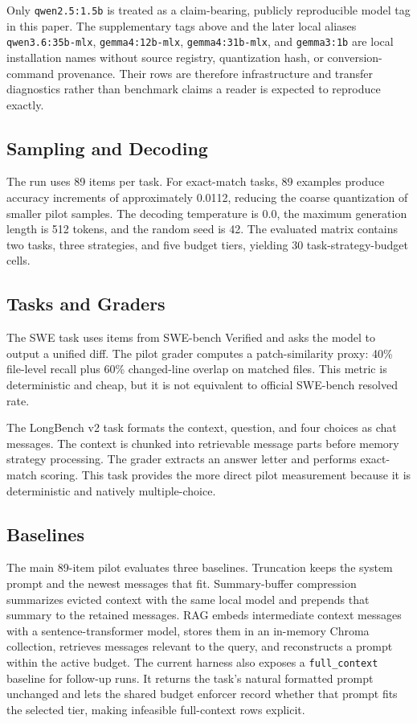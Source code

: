\documentclass[11pt]{article}
\newcommand{\RunModel}{\texttt{qwen2.5:1.5b}}
\begin{document}
Only \RunModel{} is treated as a claim-bearing, publicly reproducible model
tag in this paper.  The supplementary tags above and the later local aliases
\texttt{qwen3.6:35b-mlx}, \texttt{gemma4:12b-mlx},
\texttt{gemma4:31b-mlx}, and \texttt{gemma3:1b} are local installation names
without source registry, quantization hash, or conversion-command provenance.
Their rows are therefore infrastructure and transfer diagnostics rather than
benchmark claims a reader is expected to reproduce exactly.

\subsection{Sampling and Decoding}

The run uses 89 items per task.  For exact-match tasks, 89 examples produce
accuracy increments of approximately 0.0112, reducing the coarse quantization
of smaller pilot samples.  The decoding temperature is 0.0, the maximum
generation length is 512 tokens, and the random seed is 42.  The evaluated
matrix contains two tasks, three strategies, and five budget tiers, yielding
30 task-strategy-budget cells.

\subsection{Tasks and Graders}

The SWE task uses items from SWE-bench Verified and asks the model to output a
unified diff.  The pilot grader computes a patch-similarity proxy:
40\% file-level recall plus 60\% changed-line overlap on matched files.  This
metric is deterministic and cheap, but it is not equivalent to official
SWE-bench resolved rate.

The LongBench v2 task formats the context, question, and four choices as chat
messages.  The context is chunked into retrievable message parts before memory
strategy processing.  The grader extracts an answer letter and performs
exact-match scoring.  This task provides the more direct pilot measurement because
it is deterministic and natively multiple-choice.

\subsection{Baselines}

The main 89-item pilot evaluates three baselines.  Truncation keeps the system prompt and
the newest messages that fit.  Summary-buffer compression summarizes evicted
context with the same local model and prepends that summary to the retained
messages.  RAG embeds intermediate context messages with a sentence-transformer
model, stores them in an in-memory Chroma collection, retrieves messages
relevant to the query, and reconstructs a prompt within the active budget.
The current harness also exposes a \texttt{full\_context} baseline for
follow-up runs.  It returns the task's natural formatted prompt unchanged and
lets the shared budget enforcer record whether that prompt fits the selected
tier, making infeasible full-context rows explicit.
\end{document}
